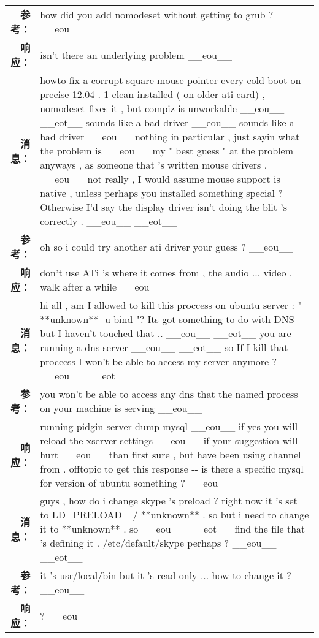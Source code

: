 \begin{tabularx}{0.8\textwidth}{@{}rX@{}}
\textbf{参考：}&how did you add nomodeset without getting to grub ? \_\_eou\_\_\\%
\textbf{响应：}&isn't there an underlying problem \_\_eou\_\_\\%
\midrule%
\textbf{消息：}&howto fix a corrupt square mouse pointer every cold boot on precise 12.04 . 1 clean installed ( on older ati card) , nomodeset fixes it , but compiz is unworkable \_\_eou\_\_ \_\_eot\_\_ sounds like a bad driver \_\_eou\_\_ sounds like a bad driver \_\_eou\_\_ nothing in particular , just sayin what the problem is \_\_eou\_\_ my " best guess " at the problem anyways , as someone that 's written mouse drivers . \_\_eou\_\_ not really , I would assume mouse support is native , unless perhaps you installed something special ? Otherwise I'd say the display driver isn't doing the blit 's correctly . \_\_eou\_\_ \_\_eot\_\_\\%
\textbf{参考：}&oh so i could try another ati driver your guess ? \_\_eou\_\_\\%
\textbf{响应：}&don't use ATi 's where it comes from , the audio ... video , walk after a while \_\_eou\_\_\\%
\midrule%
\textbf{消息：}&hi all , am I allowed to kill this proccess on ubuntu server : " **unknown** {-}u bind "? Its got something to do with DNS but I haven't touched that .. \_\_eou\_\_ \_\_eot\_\_ you are running a dns server \_\_eou\_\_ \_\_eot\_\_ so If I kill that proccess I won't be able to access my server anymore ? \_\_eou\_\_ \_\_eot\_\_\\%
\textbf{参考：}&you won't be able to access any dns that the named process on your machine is serving \_\_eou\_\_\\%
\textbf{响应：}&running pidgin server dump mysql \_\_eou\_\_ if yes you will reload the xserver settings \_\_eou\_\_ if your suggestion will hurt \_\_eou\_\_ than first sure , but have been using channel from . offtopic to get this response {-}{-} is there a specific mysql for version of ubuntu something ? \_\_eou\_\_\\%
\midrule%
\textbf{消息：}&guys , how do i change skype 's preload ? right now it 's set to LD\_PRELOAD =/ **unknown** . so but i need to change it to **unknown** . so \_\_eou\_\_ \_\_eot\_\_ find the file that 's defining it . /etc/default/skype perhaps ? \_\_eou\_\_ \_\_eot\_\_\\%
\textbf{参考：}&it 's usr/local/bin but it 's read only ... how to change it ? \_\_eou\_\_\\%
\textbf{响应：}&? \_\_eou\_\_\\%
\midrule\bottomrule%
%
\end{tabularx}